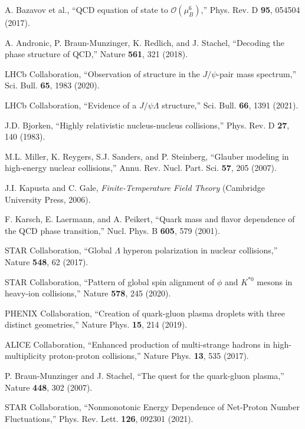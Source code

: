 \documentclass[12pt,a4paper]{article}
\begin{document}
\begin{thebibliography}{99}
A. Bazavov et al., ``QCD equation of state to $\mathcal{O}(\mu_B^6)$,'' Phys. Rev. D \textbf{95}, 054504 (2017).

A. Andronic, P. Braun-Munzinger, K. Redlich, and J. Stachel, ``Decoding the phase structure of QCD,'' Nature \textbf{561}, 321 (2018).

LHCb Collaboration, ``Observation of structure in the $J/\psi$-pair mass spectrum,'' Sci. Bull. \textbf{65}, 1983 (2020).

LHCb Collaboration, ``Evidence of a $J/\psi\Lambda$ structure,'' Sci. Bull. \textbf{66}, 1391 (2021).

J.D. Bjorken, ``Highly relativistic nucleus-nucleus collisions,'' Phys. Rev. D \textbf{27}, 140 (1983).

M.L. Miller, K. Reygers, S.J. Sanders, and P. Steinberg, ``Glauber modeling in high-energy nuclear collisions,'' Annu. Rev. Nucl. Part. Sci. \textbf{57}, 205 (2007).

J.I. Kapusta and C. Gale, \textit{Finite-Temperature Field Theory} (Cambridge University Press, 2006).

F. Karsch, E. Laermann, and A. Peikert, ``Quark mass and flavor dependence of the QCD phase transition,'' Nucl. Phys. B \textbf{605}, 579 (2001).

STAR Collaboration, ``Global $\Lambda$ hyperon polarization in nuclear collisions,'' Nature \textbf{548}, 62 (2017).

STAR Collaboration, ``Pattern of global spin alignment of $\phi$ and $K^{*0}$ mesons in heavy-ion collisions,'' Nature \textbf{578}, 245 (2020).

PHENIX Collaboration, ``Creation of quark-gluon plasma droplets with three distinct geometries,'' Nature Phys. \textbf{15}, 214 (2019).

ALICE Collaboration, ``Enhanced production of multi-strange hadrons in high-multiplicity proton-proton collisions,'' Nature Phys. \textbf{13}, 535 (2017).

P. Braun-Munzinger and J. Stachel, ``The quest for the quark-gluon plasma,'' Nature \textbf{448}, 302 (2007).

STAR Collaboration, ``Nonmonotonic Energy Dependence of Net-Proton Number Fluctuations,'' Phys. Rev. Lett. \textbf{126}, 092301 (2021).


\end{thebibliography}
\end{document}
